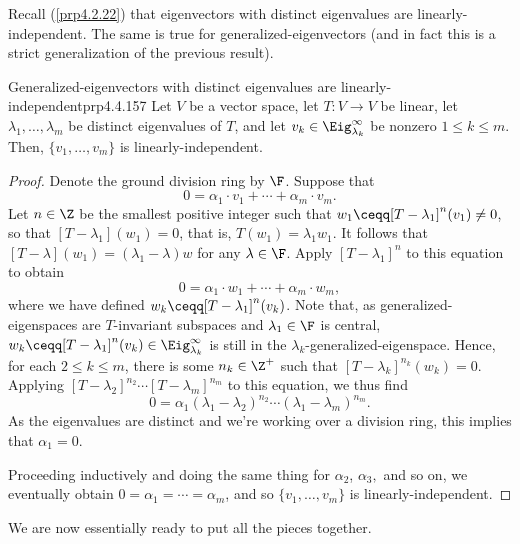 Recall (\cref{prp4.2.22}) that eigenvectors with distinct eigenvalues are linearly-independent.  The same is true for generalized-eigenvectors (and in fact this is a strict generalization of the previous result).
\begin{prp}{Generalized-eigenvectors with distinct ei\-genvalues are linearly-independent}{prp4.4.157}
	Let $V$ be a vector space, let $T\colon V\rightarrow V$ be linear, let $\lambda _1,\ldots ,\lambda _m$ be distinct eigenvalues of $T$, and let $v_k\in \Eig _{\lambda _k}^{\infty}$ be nonzero $1\leq k\leq m$.  Then, $\{ v_1,\ldots ,v_m\}$ is linearly-independent.
	\begin{proof}
		Denote the ground division ring by $\F$.  Suppose that
		\begin{equation}
			0=\alpha _1\cdot v_1+\cdots +\alpha _m\cdot v_m.
		\end{equation}
		Let $n\in \Z$ be the smallest positive integer such that $w_1\ceqq [T-\lambda _1]^n(v_1)\neq 0$, so that $[T-\lambda _1](w_1)=0$, that is, $T(w_1)=\lambda _1w_1$.  It follows that $[T-\lambda ](w_1)=(\lambda _1-\lambda )w$ for any $\lambda \in \F$.  Apply $[T-\lambda _1]^n$ to this equation to obtain
		\begin{equation}
			0=\alpha _1\cdot w_1+\cdots +\alpha _m\cdot w_m,
		\end{equation}
		where we have defined $w_k\ceqq [T-\lambda _1]^n(v_k)$.  Note that, as generalized-eigenspaces are $T$-invariant subspaces and $\lambda _1\in \F$ is central, $w_k\ceqq [T-\lambda _1]^n(v_k)\in \Eig _{\lambda _k}^{\infty}$ is still in the $\lambda _k$-generalized-eigenspace.  Hence, for each $2\leq k\leq m$, there is some $n_k\in \Z ^+$ such that $[T-\lambda _k]^{n_k}(w_k)=0$.  Applying $[T-\lambda _2]^{n_2}\cdots [T-\lambda _m]^{n_m}$ to this equation, we thus find
		\begin{equation}
			0=\alpha _1(\lambda _1-\lambda _2)^{n_2}\cdots (\lambda _1-\lambda _m)^{n_m}.
		\end{equation}
		As the eigenvalues are distinct and we're working over a division ring, this implies that $\alpha _1=0$.
		
		Proceeding inductively and doing the same thing for $\alpha _2$, $\alpha _3,$ and so on, we eventually obtain $0=\alpha _1=\cdots =\alpha _m$, and so $\{ v_1,\ldots ,v_m\}$ is linearly-independent.
	\end{proof}
\end{prp}

We are now essentially ready to put all the pieces together.

